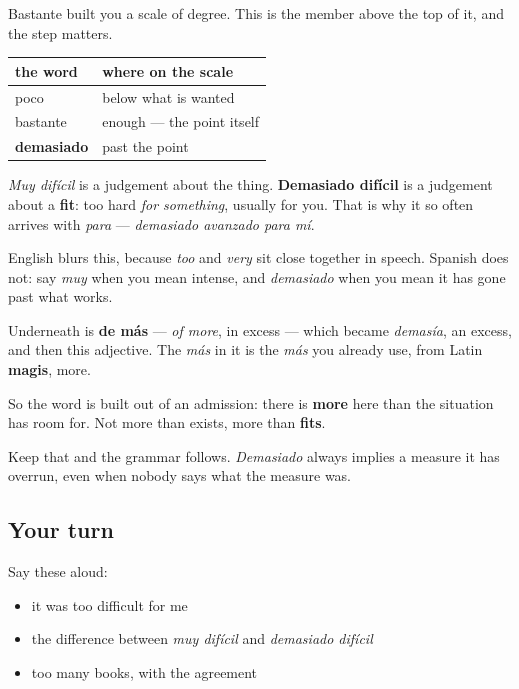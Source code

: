\begin{grammarlens}[title={Grammar Lens: the word that says it went past the point}]
Bastante built you a scale of degree. This is the member above the top of it, and the step matters.

\noindent
\begin{tabularx}{\linewidth}{@{}>{\raggedright\arraybackslash}X>{\raggedright\arraybackslash}X@{}}
\toprule
\textbf{the word} & \textbf{where on the scale} \\
\midrule
poco & below what is wanted \\
bastante & enough — the point itself \\
\textbf{demasiado} & past the point \\
\bottomrule
\end{tabularx}

\emph{Muy difícil} is a judgement about the thing. \textbf{Demasiado difícil} is a judgement about a \textbf{fit}: too hard \emph{for something}, usually for you. That is why it so often arrives with \emph{para} — \emph{demasiado avanzado para mí}.

English blurs this, because \emph{too} and \emph{very} sit close together in speech. Spanish does not: say \emph{muy} when you mean intense, and \emph{demasiado} when you mean it has gone past what works.
\end{grammarlens}

\begin{cousinweb}
Underneath is \textbf{de más} — \emph{of more}, in excess — which became \emph{demasía}, an excess, and then this adjective. The \emph{más} in it is the \emph{más} you already use, from Latin \textbf{magis}, more.

So the word is built out of an admission: there is \textbf{more} here than the situation has room for. Not more than exists, more than \textbf{fits}.

Keep that and the grammar follows. \emph{Demasiado} always implies a measure it has overrun, even when nobody says what the measure was.
\end{cousinweb}

\subsection*{Your turn}
Say these aloud:

\begin{itemize}
\raggedright
  \item it was too difficult for me
  \item the difference between \emph{muy difícil} and \emph{demasiado difícil}
  \item too many books, with the agreement
\end{itemize}

